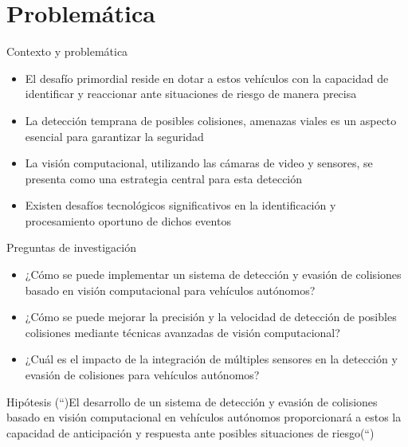 \documentclass[8pt]{beamer}
\begin{document}
    \section{Problemática}
    \begin{frame}{Contexto y problemática}
        \begin{itemize}
            \item El desafío primordial reside en dotar a estos vehículos con la capacidad de identificar y reaccionar ante situaciones de riesgo de manera precisa
            \item La detección temprana de posibles colisiones, amenazas viales es un aspecto esencial para garantizar la seguridad
            \item La visión computacional, utilizando las cámaras de video y sensores, se presenta como una estrategia central para esta detección
            \item Existen desafíos tecnológicos significativos en la identificación y procesamiento oportuno de dichos eventos
        \end{itemize}
    \end{frame}
    \begin{frame}{Preguntas de investigación}
        \begin{itemize}
            \item ¿Cómo se puede implementar un sistema de detección y evasión de colisiones basado en visión computacional para vehículos autónomos?
            \item ¿Cómo se puede mejorar la precisión y la velocidad de detección de posibles colisiones mediante técnicas avanzadas de visión computacional?
            \item ¿Cuál es el impacto de la integración de múltiples sensores en la detección y evasión de colisiones para vehículos autónomos?
        \end{itemize}
    \end{frame}
    \begin{frame}{Hipótesis}
        (``)El desarrollo de un sistema de detección y evasión de colisiones basado en visión computacional en vehículos autónomos
        proporcionará a estos la capacidad de anticipación y respuesta ante posibles situaciones de riesgo(``)
    \end{frame}
\end{document}
